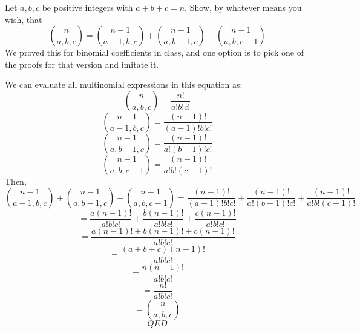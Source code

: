 \documentclass[11pt]{amsart}
\begin{document}
\begin{problem}

Let $a,b,c$ be positive integers with $a+b+c=n$.  Show, by whatever means you wish, that 
$$\binom{n}{a,b,c} = \binom{n-1}{a-1,b,c}+\binom{n-1}{a,b-1,c}+\binom{n-1}{a,b,c-1}$$
We proved this for binomial coefficients in class, and one option is to pick one of the proofs for that version and imitate it. 
\end{problem}
\begin{solution}

We can evaluate all multinomial expressions in this equation as:
$$\binom{n}{a,b,c} = \frac{n!}{a!b!c!}$$
$$\binom{n-1}{a-1,b,c} = \frac{(n-1)!}{(a-1)!b!c!}$$
$$\binom{n-1}{a,b-1,c} = \frac{(n-1)!}{a!(b-1)!c!}$$
$$\binom{n-1}{a,b,c-1} = \frac{(n-1)!}{a!b!(c-1)!}$$
Then,
$$\binom{n-1}{a-1,b,c} + \binom{n-1}{a,b-1,c} + \binom{n-1}{a,b,c-1} = \frac{(n-1)!}{(a-1)!b!c!} + \frac{(n-1)!}{a!(b-1)!c!} + \frac{(n-1)!}{a!b!(c-1)!}$$
$$= \frac{a(n-1)!}{a!b!c!} + \frac{b(n-1)!}{a!b!c!} + \frac{c(n-1)!}{a!b!c!}$$
$$= \frac{a(n-1)!+b(n-1)!+c(n-1)!}{a!b!c!}$$
$$= \frac{(a+b+c)(n-1)!}{a!b!c!}$$
$$= \frac{n(n-1)!}{a!b!c!}$$
$$= \frac{n!}{a!b!c!}$$
$$ = \binom{n}{a,b,c}$$
$$QED$$
\end{solution}
 
\end{document}
